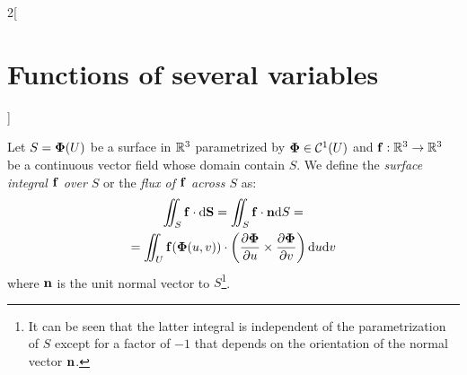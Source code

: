 \documentclass[../../../main.tex]{subfiles}
\begin{document}
\begin{multicols}{2}[\section{Functions of several variables}]
\begin{definition}
        Let $S=\boldsymbol{\mathrm{\Phi}}(U)$ be a surface in $\mathbb{R}^3$ parametrized by $\boldsymbol{\mathrm{\Phi}}\in\mathcal{C}^1(U)$ and $\boldsymbol{\mathrm{f}}:\mathbb{R}^3\rightarrow\mathbb{R}^3$ be a continuous vector field  whose domain contain $S$. We define the \textit{surface integral $\boldsymbol{\mathrm{f}}$ over $S$} or the \textit{flux of $\boldsymbol{\mathrm{f}}$ across $S$} as:
        \begin{multline*}
            \iint_S\boldsymbol{\mathrm{f}}\cdot \dd \boldsymbol{\mathrm{S}}=\iint_S\boldsymbol{\mathrm{f}}\cdot\boldsymbol{\mathrm{n}} \dd S=\\=\iint_U \boldsymbol{\mathrm{f}}(\boldsymbol{\mathrm{\Phi}}(u,v))\cdot\left(\frac{\partial \boldsymbol{\mathrm{\Phi}}}{\partial u}\times\frac{\partial \boldsymbol{\mathrm{\Phi}}}{\partial v}\right) \dd u\dd v
        \end{multline*} where $\boldsymbol{\mathrm{n}}$ is the unit normal vector to $S$\footnote{It can be seen that the latter integral is independent of the parametrization of $S$ except for a factor of $-1$ that depends on the orientation of the normal vector $\boldsymbol{\mathrm{n}}$.}.
    \end{definition}

\end{multicols}
\end{document}

